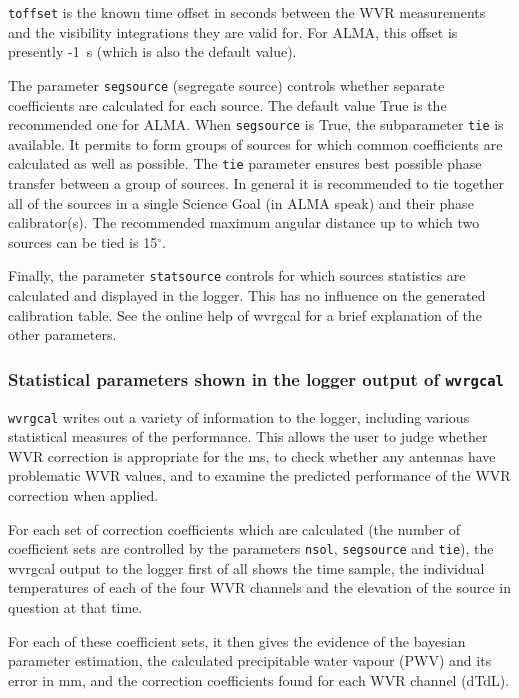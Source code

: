 {\tt toffset} is the known time offset in seconds between the WVR
measurements and the visibility integrations they are valid for. For
ALMA, this offset is presently -1~s (which is also the default value).

The parameter {\tt segsource} (segregate source) controls whether
separate coefficients are calculated for each source. The default
value True is the recommended one for ALMA.  When {\tt segsource} is
True, the subparameter {\tt tie} is available. It permits to form
groups of sources for which common coefficients are calculated as well
as possible. The {\tt tie} parameter ensures best possible phase
transfer between a group of sources. In general it is recommended to
tie together all of the sources in a single Science Goal (in ALMA
speak) and their phase calibrator(s).  The recommended maximum angular
distance up to which two sources can be tied is 15$^\circ$.

Finally, the parameter {\tt statsource} controls for which sources statistics are calculated and
displayed in the logger. This has no influence on the generated calibration table.
See the online help of wvrgcal for a brief explanation of the other
parameters.


\subsubsection{Statistical parameters shown in the logger output of {\tt wvrgcal}}

{\tt wvrgcal} writes out a variety of information to
the logger, including various statistical measures of the performance.
This allows the user to judge whether WVR correction is appropriate
for the ms, to check whether any antennas have problematic WVR values,
and to examine the predicted performance of the WVR correction when
applied.

For each set of correction coefficients which are calculated (the
number of coefficient sets are controlled by the parameters
{\tt nsol}, {\tt segsource} and {\tt tie}), the wvrgcal output to the logger
first of all shows the
time sample, the individual temperatures of each of the four WVR
channels and the elevation of the source in question at that time. 

For each of these coefficient sets, it then gives the evidence of the
bayesian parameter estimation, the calculated precipitable water
vapour (PWV) and its error in mm, and the correction coefficients
found for each WVR channel (dTdL).

